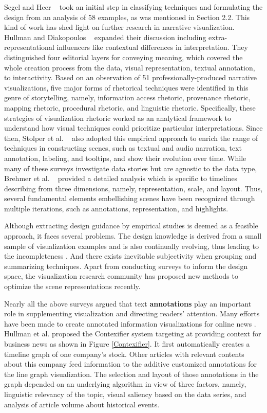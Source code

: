 Segel and Heer ~\cite{Segel2010} took an initial step in classifying techniques and formulating the design from an analysis of 58 examples, as was mentioned in Section 2.2. This kind of work has shed light on further research in narrative visualization. Hullman and Diakopoulos ~\cite{Hullman2011} expanded their discussion including extra-representational influencers like contextual differences in interpretation. They distinguished four editorial layers for conveying meaning, which covered the whole creation process from the data, visual representation, textual annotation, to interactivity. Based on an observation of 51 professionally-produced narrative visualizations, five major forms of rhetorical techniques were identified in this genre of storytelling, namely, information access rhetoric, provenance rhetoric, mapping rhetoric, procedural rhetoric, and linguistic rhetoric. Specifically, these strategies of visualization rhetoric worked as an analytical framework to understand how visual techniques could prioritize particular interpretations. Since then, Stolper et al. ~\cite{Stolper2016} also adopted this empirical approach to enrich the range of techniques in constructing scenes, such as textual and audio narration, text annotation, labeling, and tooltips, and show their evolution over time. While many of these surveys investigate data stories but are agnostic to the data type, Brehmer et al. ~\cite{Brehmer2017} provided a detailed analysis which is specific to timelines describing from three dimensions, namely, representation, scale, and layout. Thus, several fundamental elements embellishing scenes have been recognized through multiple iterations, such as annotations, representation, and highlights.

Although extracting design guidance by empirical studies is deemed as a feasible approach, it faces several problems.  The design knowledge is derived from a small sample of visualization examples and is also continually evolving, thus leading to the incompleteness \cite{Moritz2018}. And there exists inevitable subjectivity when grouping and summarizing techniques. Apart from conducting surveys to inform the design space, the visualization research community has proposed new methods to optimize the scene representations recently. 

Nearly all the above surveys argued that text \textbf{annotations} play an important role in supplementing visualization and directing readers' attention. Many efforts have been made to create annotated information visualizations for online news \cite{Hullman2013, Gao2014}. Hullman et al. \cite{Hullman2013} proposed the Contexifier system targeting at providing context for business news as shown in Figure \ref{Contexifier}. It first automatically creates a timeline graph of one company’s stock. Other articles with relevant contents about this company feed information to the additive customized annotations for the line graph visualization. The selection and layout of those annotations in the graph depended on an underlying algorithm in view of three factors, namely, linguistic relevancy of the topic, visual saliency based on the data series, and analysis of article volume about historical events. 

